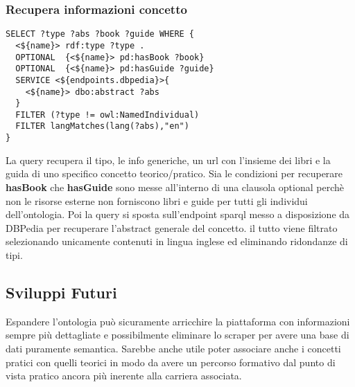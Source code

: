\subsubsection{Recupera informazioni concetto}
\begin{lstlisting}
SELECT ?type ?abs ?book ?guide WHERE {
  <${name}> rdf:type ?type .
  OPTIONAL  {<${name}> pd:hasBook ?book}
  OPTIONAL  {<${name}> pd:hasGuide ?guide}
  SERVICE <${endpoints.dbpedia}>{
    <${name}> dbo:abstract ?abs
  }
  FILTER (?type != owl:NamedIndividual)
  FILTER langMatches(lang(?abs),"en")
}
\end{lstlisting}
La query recupera il tipo, le info generiche, un url con l'insieme dei libri e la guida di uno specifico concetto teorico/pratico. Sia le condizioni per recuperare \textbf{hasBook} che \textbf{hasGuide} sono messe all'interno di una clausola optional perchè non le risorse esterne non forniscono libri e guide per tutti gli individui dell'ontologia. Poi la query si sposta sull'endpoint sparql messo a disposizione da DBPedia per recuperare l'abstract generale del concetto. il tutto viene filtrato selezionando unicamente contenuti in lingua inglese ed eliminando ridondanze di tipi. 
\subsection{Sviluppi Futuri}
Espandere l'ontologia può sicuramente arricchire la piattaforma con informazioni sempre più dettagliate e possibilmente eliminare lo scraper per avere una base di dati puramente semantica. Sarebbe anche utile poter associare anche i concetti pratici con quelli teorici in modo da avere un percorso formativo dal punto di vista pratico ancora più inerente alla carriera associata.
